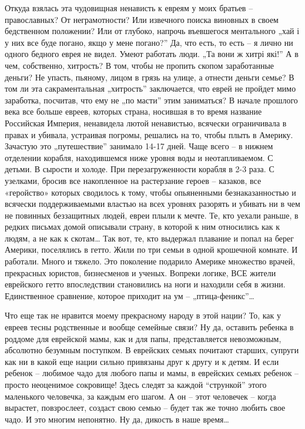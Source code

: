 Откуда взялась эта чудовищная ненависть к евреям у моих братьев – православных?
От неграмотности? Или извечного поиска виновных в своем бедственном положении?
Или от глубоко, напрочь въевшегося ментального „хай і у них все буде погано,
якщо у мене погано?” Да, что есть, то есть – я лично ни одного бедного еврея не
видел. Умеют работать люди. „Та вони ж хитрі які!” А в чем, собственно,
хитрость? В том, чтобы не пропить скопом заработанные деньги? Не упасть,
пьяному, лицом в грязь на улице, а отнести деньги семье? В том ли эта
сакраментальная „хитрость” заключается, что еврей не пройдет мимо заработка,
посчитав, что ему не „по масти” этим заниматься?  В начале прошлого века все
больше евреев, которых страна, носившая в то время название Российская Империя,
ненавидела лютой ненавистью, всячески ограничивала в правах и убивала,
устраивая погромы, решались на то, чтобы плыть в Америку. Зачастую это
„путешествие” занимало 14-17 дней. Чаще всего – в нижнем отделении корабля,
находившемся ниже уровня воды и неотапливаемом. С детьми. В сырости и холоде.
При перезагруженности корабля в 2-3 раза. С узелками, бросив все накопленное на
растерзание героев – казаков, все «геройство» которых сводилось к тому, чтобы
опьяненными безнаказанностью и всячески поддерживаемыми властью на всех уровнях
разорять и убивать ни в чем не повинных беззащитных людей, евреи плыли к мечте.
Те, кто уехали раньше, в редких письмах домой описывали страну, в которой к ним
относились как к людям, а не как к скотам… Так вот, те, кто выдержал плавание и
попал на берег Америки, поселялись в гетто. Жили по три семьи в одной крошечной
комнате. И работали. Много и тяжело. Это поколение подарило Америке множество
врачей, прекрасных юристов, бизнесменов и ученых. Вопреки логике, ВСЕ жители
еврейского гетто впоследствии становились на ноги и находили себя в жизни.
Единственное сравнение, которое приходит на ум – „птица-феникс”… 

Что еще так не нравится моему прекрасному народу в этой нации? То, как у евреев
тесны родственные и вообще семейные связи? Ну да, оставить ребенка в роддоме
для еврейской мамы, как и для папы, представляется невозможным, абсолютно
безумным поступком. В еврейских семьях почитают старших, супруги как ни в какой
еще нации сильно привязаны друг к другу и к детям. И если ребенок – любимое
чадо для любого папы и мамы, в еврейских семьях ребенок – просто неоценимое
сокровище! Здесь следят за каждой “стрункой” этого маленького человечка, за
каждым его шагом. А он – этот человечек – когда вырастет, повзрослеет, создаст
свою семью – будет так же точно любить свое чадо. И это многим непонятно. Ну
да, дикость в наше время… 

